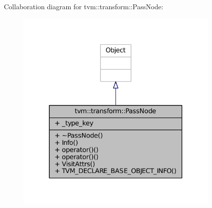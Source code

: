 Collaboration diagram for tvm\+:\+:transform\+:\+:Pass\+Node\+:
\nopagebreak
\begin{figure}[H]
\begin{center}
\leavevmode
\includegraphics[width=284pt]{classtvm_1_1transform_1_1PassNode__coll__graph}
\end{center}
\end{figure}

